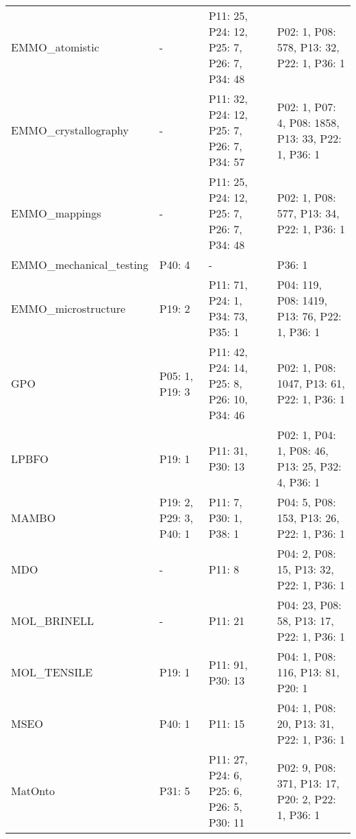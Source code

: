\begin{tabular}{m{4cm}m{3cm}m{3cm}m{5cm}}
         EMMO_atomistic &                       - &                P11: 25, P24: 12, P25: 7, P26: 7, P34: 48 &                  P02: 1, P08: 578, P13: 32, P22: 1, P36: 1 \\
   EMMO_crystallography &                       - &                P11: 32, P24: 12, P25: 7, P26: 7, P34: 57 &         P02: 1, P07: 4, P08: 1858, P13: 33, P22: 1, P36: 1 \\
          EMMO_mappings &                       - &                P11: 25, P24: 12, P25: 7, P26: 7, P34: 48 &                  P02: 1, P08: 577, P13: 34, P22: 1, P36: 1 \\
EMMO_mechanical_testing &                  P40: 4 &                                                        - &                                                     P36: 1 \\
    EMMO_microstructure &                  P19: 2 &                         P11: 71, P24: 1, P34: 73, P35: 1 &               P04: 119, P08: 1419, P13: 76, P22: 1, P36: 1 \\
                    GPO &          P05: 1, P19: 3 &               P11: 42, P24: 14, P25: 8, P26: 10, P34: 46 &                 P02: 1, P08: 1047, P13: 61, P22: 1, P36: 1 \\
                  LPBFO &                  P19: 1 &                                         P11: 31, P30: 13 &           P02: 1, P04: 1, P08: 46, P13: 25, P32: 4, P36: 1 \\
                  MAMBO &  P19: 2, P29: 3, P40: 1 &                                   P11: 7, P30: 1, P38: 1 &                  P04: 5, P08: 153, P13: 26, P22: 1, P36: 1 \\
                    MDO &                       - &                                                   P11: 8 &                   P04: 2, P08: 15, P13: 32, P22: 1, P36: 1 \\
            MOL_BRINELL &                       - &                                                  P11: 21 &                  P04: 23, P08: 58, P13: 17, P22: 1, P36: 1 \\
            MOL_TENSILE &                  P19: 1 &                                         P11: 91, P30: 13 &                          P04: 1, P08: 116, P13: 81, P20: 1 \\
                   MSEO &                  P40: 1 &                                                  P11: 15 &                   P04: 1, P08: 20, P13: 31, P22: 1, P36: 1 \\
                MatOnto &                  P31: 5 &                 P11: 27, P24: 6, P25: 6, P26: 5, P30: 11 &          P02: 9, P08: 371, P13: 17, P20: 2, P22: 1, P36: 1 \\

\end{tabular}
